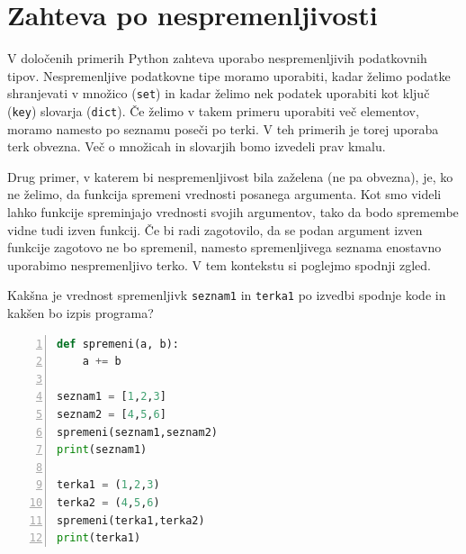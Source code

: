 \section{Zahteva po nespremenljivosti}
V določenih primerih Python zahteva uporabo nespremenljivih podatkovnih tipov. Nespremenljive podatkovne tipe moramo uporabiti, kadar želimo podatke shranjevati v množico (\texttt{set}) in kadar želimo nek podatek uporabiti kot ključ (\texttt{key}) slovarja (\texttt{dict}). Če želimo v takem primeru uporabiti več elementov, moramo namesto po seznamu poseči po terki. V teh primerih je torej uporaba terk obvezna. Več o množicah in slovarjih bomo izvedeli prav kmalu.

Drug primer, v katerem bi nespremenljivost bila zaželena (ne pa obvezna), je, ko ne želimo, da funkcija spremeni vrednosti posanega argumenta. Kot smo videli lahko funkcije spreminjajo vrednosti svojih argumentov, tako da bodo spremembe vidne tudi izven funkcij. Če bi radi zagotovilo, da se podan argument izven funkcije zagotovo ne bo spremenil, namesto spremenljivega seznama enostavno uporabimo nespremenljivo terko. V tem kontekstu si poglejmo spodnji zgled.

\begin{zgled}
Kakšna je vrednost spremenljivk \texttt{seznam1} in \texttt{terka1}  po izvedbi spodnje kode in kakšen bo izpis programa?
\begin{lstlisting}[language=Python, showstringspaces=false,numbers=left]
def spremeni(a, b):
    a += b

seznam1 = [1,2,3]
seznam2 = [4,5,6]
spremeni(seznam1,seznam2)
print(seznam1)

terka1 = (1,2,3)
terka2 = (4,5,6)
spremeni(terka1,terka2)
print(terka1)
\end{lstlisting}
\end{zgled}

